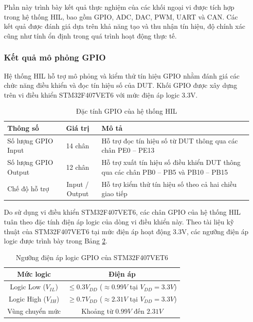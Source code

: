 Phần này trình bày kết quả thực nghiệm của các khối ngoại vi được tích hợp trong hệ thống HIL, bao gồm GPIO, ADC, DAC, PWM, UART và CAN. Các kết quả được đánh giá dựa trên khả năng tạo và thu nhận tín hiệu, độ chính xác cũng như tính ổn định trong quá trình hoạt động thực tế.

\subsubsection{Kết quả mô phỏng GPIO}

Hệ thống HIL hỗ trợ mô phỏng và kiểm thử tín hiệu GPIO nhằm đánh giá các chức năng điều khiển và đọc tín hiệu số của DUT. Khối GPIO được xây dựng trên vi điều khiển STM32F407VET6 với mức điện áp logic 3.3V.


\begin{table}[H]
\centering
\caption{Đặc tính GPIO của hệ thống HIL}
\label{tab:gpio_support}
\renewcommand{\arraystretch}{1.2}

\begin{tabularx}{\textwidth}{|l|c|X|}
\hline
\textbf{Thông số} & \textbf{Giá trị} & \textbf{Mô tả} \\
\hline

Số lượng GPIO Input 
& 14 chân 
& Hỗ trợ đọc tín hiệu số từ DUT thông qua các chân PE0 -- PE13 \\
\hline

Số lượng GPIO Output 
& 12 chân 
& Hỗ trợ xuất tín hiệu số điều khiển DUT thông qua các chân PB0 -- PB5 và PB10 -- PB15 \\
\hline

Chế độ hỗ trợ 
& Input / Output 
& Hỗ trợ kiểm thử tín hiệu số theo cả hai chiều giao tiếp \\
\hline

\end{tabularx}
\end{table}

Do sử dụng vi điều khiển STM32F407VET6, các chân GPIO của hệ thống HIL tuân theo đặc tính điện áp logic của dòng vi điều khiển này. Theo tài liệu kỹ thuật của STM32F407VET6 tại mức điện áp hoạt động 3.3V, các ngưỡng điện áp logic được trình bày trong Bảng \ref{tab:gpio_logic_level}.

\begin{table}[H]
\centering
\caption{Ngưỡng điện áp logic GPIO của STM32F407VET6}
\label{tab:gpio_logic_level}
\renewcommand{\arraystretch}{1.2}

\begin{tabular}{|c|c|}
\hline
\textbf{Mức logic} & \textbf{Điện áp} \\
\hline

Logic Low ($V_{IL}$) 
& $\le 0.3V_{DD}$ ($\approx 0.99V$ tại $V_{DD}=3.3V$) \\
\hline

Logic High ($V_{IH}$) 
& $\ge 0.7V_{DD}$ ($\approx 2.31V$ tại $V_{DD}=3.3V$) \\
\hline

Vùng chuyển mức 
& Khoảng từ $0.99V$ đến $2.31V$ \\
\hline

\end{tabular}

\end{table}

